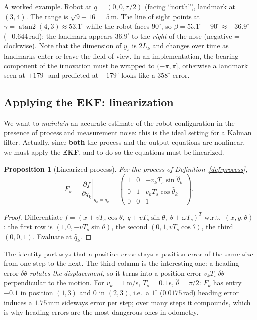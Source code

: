 \documentclass[11pt,a4paper]{article}
\def\bm#1{#1}%
\def\boldsymbol#1{#1}%
\DeclareMathOperator{\atantwo}{atan2}
\newcommand{\hq}{\hat{\boldsymbol{q}}}
\newcommand{\slides}[1]{\texorpdfstring{\hspace{0.5em}{\normalfont\small\emph{(#1)}}}{}}
\theoremstyle{definition}
\theoremstyle{plain}
\newtheorem{proposition}[definition]{Proposition}
\theoremstyle{remark}
\begin{document}
\begin{intuition}
A worked example. Robot at $\bm q=(0,0,\pi/2)$ (facing ``north''), landmark at $(3,4)$. The range is $\sqrt{9+16}=5$\,m. The line of sight points at $\gamma=\atantwo(4,3)\approx53.1^\circ$ while the robot faces $90^\circ$, so $\beta=53.1^\circ-90^\circ\approx-36.9^\circ$ ($-0.644$\,rad): the landmark appears $36.9^\circ$ to the \emph{right} of the nose (negative = clockwise). Note that the dimension of $\bm y_k$ is $2L_k$ and changes over time as landmarks enter or leave the field of view. In an implementation, the bearing component of the innovation must be wrapped to $(-\pi,\pi]$, otherwise a landmark seen at $+179^\circ$ and predicted at $-179^\circ$ looks like a $358^\circ$ error.
\end{intuition}

\subsection{Applying the EKF: linearization}
\slides{slides 8--9}

We want to \emph{maintain} an accurate estimate of the robot configuration in the presence of process and measurement noise: this is the ideal setting for a Kalman filter. Actually, since \textbf{both} the process and the output equations are nonlinear, we must apply the \textbf{EKF}, and to do so the equations must be linearized.

\begin{proposition}[Linearized process]
\label{prop:F}
For the process of Definition~\ref{def:process},
\[
\bm F_k=\left.\frac{\partial\bm f}{\partial\bm q_k}\right|_{\bm q_k=\hq_k}=
\begin{pmatrix}
1&0&-v_kT_s\sin\hat\theta_k\\
0&1&v_kT_s\cos\hat\theta_k\\
0&0&1
\end{pmatrix}.
\]
\end{proposition}
\begin{proof}
Differentiate $\bm f=(x+vT_s\cos\theta,\;y+vT_s\sin\theta,\;\theta+\omega T_s)^T$ w.r.t.\ $(x,y,\theta)$: the first row is $(1,0,-vT_s\sin\theta)$, the second $(0,1,vT_s\cos\theta)$, the third $(0,0,1)$. Evaluate at $\hq_k$.
\end{proof}

\begin{intuition}
The identity part says that a position error stays a position error of the same size from one step to the next. The third column is the interesting one: a heading error $\delta\theta$ \emph{rotates the displacement}, so it turns into a position error $v_kT_s\,\delta\theta$ perpendicular to the motion. For $v_k=1$\,m/s, $T_s=0.1$\,s, $\hat\theta=\pi/2$: $\bm F_k$ has entry $-0.1$ in position $(1,3)$ and $0$ in $(2,3)$, i.e.\ a $1^\circ$ ($0.0175$\,rad) heading error induces a $1.75$\,mm sideways error per step; over many steps it compounds, which is why heading errors are the most dangerous ones in odometry.
\end{intuition}
\end{document}
